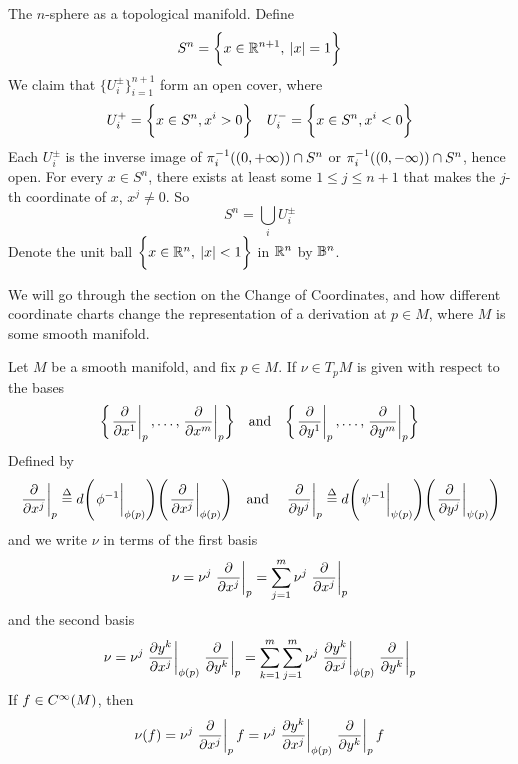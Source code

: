 \documentclass[../main-manifolds.tex]{subfiles}
\begin{document}
The $n$-sphere as a topological manifold. Define 
\[
    S^n = \biggl\{{x\in\mathbb{R}^{n+1},\: |x|=1}\biggr\}
\]
We claim that $\{U_i^{\pm}\}_{i=1}^{n+1}$ form an open cover, where
\[
    U_i^+ = \biggl\{{x\in S^n, x^i>0}\biggr\}\quad U_i^- = \biggl\{{x\in S^n, x^i<0}\biggr\}
\]
Each $U_i^{\pm}$ is the inverse image of $\pi_{i}^{-1}({(0,+\infty)})\cap S^n$ or $\pi_{i}^{-1}({(0,-\infty)})\cap S^n$, hence open. For every $x\in S^n$, there exists at least some $1\leq j\leq n+1$ that makes the $j$-th coordinate of $x$, $x^j\neq 0$. So 
\[
    S^n = \bigcup_{i}U_i^\pm
\]
Denote the unit ball $\biggl\{{x\in{\mathbb{R}^n},\: |x|<1}\biggr\}$ in ${\mathbb{R}^n}$ by ${\mathbb{B}}^n$. 

\newpage


\newpage

We will go through the section on the Change of Coordinates, and how different coordinate charts change the representation of a derivation at $p\in M$, where $M$ is some smooth  manifold.
\begin{wts}
    Let $M$ be a smooth manifold, and fix $p\in M$. If $\nu\in T_pM$ is given with respect to the bases
    \[
        \bigset{\eval{\pdv{x^1}}_{p},\ldots,\eval{\pdv{x^m}}_{p}}\qq{and}\bigset{\eval{\pdv{y^1}}_p,\ldots,\eval{\pdv{y^m}}_{p}}
    \]
    Defined by 
    \[\eval{\pdv{x^j}}_{p}\defined d\qty(\eval{\phi^{-1}}_{\phi(p)})\qty(\eval{\pdv{x^j}}_{\phi(p)})
    \qq{and}
    \eval{\pdv{y^j}}_{p}\defined d\qty(\eval{\psi^{-1}}_{\psi(p)})\qty(\eval{\pdv{y^j}}_{\psi(p)})\]
    and we write $\nu$ in terms of the first basis
    \[
        \nu = \nu^j\eval{\pdv{x^j}}_{p} = \sum_{j=1}^m \nu^j\eval{\pdv{x^j}}_{p}
    \]
    and the second basis
    \[
        \nu = \nu^j\eval{\pdv{y^k}{x^j}}_{\phi(p)}\eval{\pdv{y^k}}_{p} = \sum_{k=1}^m\sum_{j=1}^m \nu^j\eval{\pdv{y^k}{x^j}}_{\phi(p)}\eval{\pdv{y^k}}_p
    \]
    If $f\in \cinf[M]$, then 
    \[
        \nu(f) = \nu^j\eval{\pdv{x^j}}_{p} f =\nu^j\eval{\pdv{y^k}{x^j}}_{\phi(p)}\eval{\pdv{y^k}}_{p} f
    \]
\end{wts}
\end{document}
